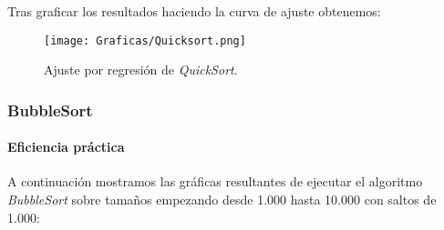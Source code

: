 \documentclass[a4paper,12pt]{article} %
\begin{document}
Tras graficar los resultados haciendo la curva de ajuste obtenemos:
\begin{figure}[H]
	\centering
	\texttt{[image: Graficas/Quicksort.png]}
	\caption{Ajuste por regresión de \textit{QuickSort}.}
\end{figure}

\subsubsection{BubbleSort}
\paragraph{Eficiencia práctica}

A continuación mostramos las gráficas resultantes de ejecutar el algoritmo \textit{BubbleSort}
sobre tamaños empezando desde 1.000 hasta 10.000 con saltos de 1.000:
\end{document}
